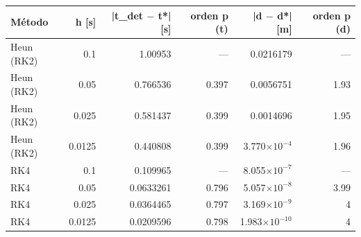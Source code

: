 {\footnotesize
\begin{longtable}{lrrrrr}
\toprule
\textbf{Método} & \textbf{h [s]} & \textbf{|t\_det $-$ t*| [s]} & \textbf{orden p (t)} & \textbf{|d $-$ d*| [m]} & \textbf{orden p (d)} \\
\midrule
\endhead
Heun (RK2) & 0.1 & 1.00953 & — & 0.0216179 & — \\
Heun (RK2) & 0.05 & 0.766536 & 0.397 & 0.0056751 & 1.93 \\
Heun (RK2) & 0.025 & 0.581437 & 0.399 & 0.0014696 & 1.95 \\
Heun (RK2) & 0.0125 & 0.440808 & 0.399 & 3.770$\times10^{-4}$ & 1.96 \\
RK4 & 0.1 & 0.109965 & — & 8.055$\times10^{-7}$ & — \\
RK4 & 0.05 & 0.0633261 & 0.796 & 5.057$\times10^{-8}$ & 3.99 \\
RK4 & 0.025 & 0.0364465 & 0.797 & 3.169$\times10^{-9}$ & 4 \\
RK4 & 0.0125 & 0.0209596 & 0.798 & 1.983$\times10^{-10}$ & 4 \\
\bottomrule
\end{longtable}
}
